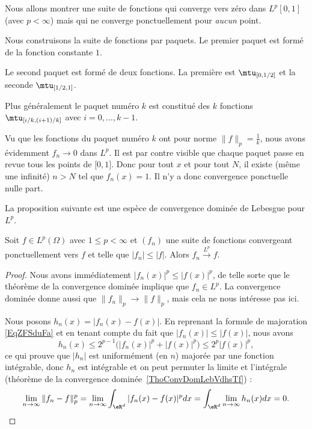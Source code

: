 \begin{example} \label{ExPOmxICc}
    Nous allons montrer une suite de fonctions qui converge vers zéro dans \( L^p[0,1]\) (avec \( p<\infty\)) mais qui ne converge ponctuellement pour \emph{aucun} point.

    Nous construisons la suite de fonctions par paquets. Le premier paquet est formé de la fonction constante \( 1\).

    Le second paquet est formé de deux fonctions. La première est \( \mtu_{\mathopen[0 , 1/2 \mathclose]}\) et la seconde \( \mtu_{\mathopen[ 1/2 , 1 \mathclose]}\).

    Plus généralement le paquet numéro \( k\) est constitué des \( k\) fonctions \( \mtu_{\mathopen[ i/k , (i+1)/k \mathclose]}\) avec \( i=0,\ldots, k-1\).

    Vu que les fonctions du paquet numéro \( k\) ont pour norme \( \| f \|_p=\frac{1}{ k }\), nous avons évidemment \( f_n\to 0\) dans \( L^p\). Il est par contre visible que chaque paquet passe en revue tous les points de \( \mathopen[ 0 , 1 \mathclose]\). Donc pour tout \( x\) et pour tout \( N\), il existe (même une infinité) \( n>N\) tel que \( f_n(x)=1\). Il n'y a donc convergence ponctuelle nulle part.
\end{example}

La proposition suivante est une espèce de convergence dominée de Lebesgue pour \( L^p\).
\begin{proposition} \label{PropBVHXycL}
    Soit \( f\in L^p(\Omega)\) avec \( 1\leq p<\infty\) et \( (f_n)\) une suite de fonctions convergeant ponctuellement vers \( f\) et telle que \( | f_n |\leq | f |\). Alors \( f_n\stackrel{L^p}{\longrightarrow}f\).
\end{proposition}

\begin{proof}
    Nous avons immédiatement \( | f_n(x) |^p\leq | f(x) |^p\), de telle sorte que le théorème de la convergence dominée implique que \( f_n\in L^p\). La convergence dominée donne aussi que \( \| f_n \|_p\to\| f \|_p\), mais cela ne nous intéresse pas ici.

    Nous posons \( h_n(x)= | f_n(x)-f(x) | \). En reprenant la formule de majoration \eqref{EqZFSduFa} et en tenant compte du fait que \( | f_n(x) |\leq | f(x) |\), nous avons
   \begin{equation}
       h_n(x)\leq 2^{p-1}\big( | f_n(x) |^p+| f(x) |^p \big)\leq 2^p| f(x) |^p,
   \end{equation}
   ce qui prouve que \( | h_n |\) est uniformément (en \( n\)) majorée par une fonction intégrable, donc \( h_n\) est intégrable et on peut permuter la limite et l'intégrale (théorème de la convergence dominée~\ref{ThoConvDomLebVdhsTf}) :
   \begin{equation}
       \lim_{n\to \infty} \| f_n-f \|^p_p=\lim_{n\to \infty} \int_{\eR^d}| f_n(x)-f(x) |^pdx=\int_{\eR^d}\lim_{n\to \infty} h_n(x)dx=0.
   \end{equation}
\end{proof}

